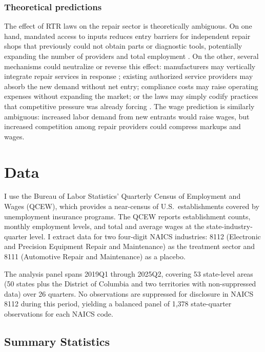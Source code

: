 \documentclass[12pt]{article}
\begin{document}
\subsubsection*{Theoretical predictions} The effect of RTR laws on the repair sector is theoretically ambiguous. On one hand, mandated access to inputs reduces entry barriers for independent repair shops that previously could not obtain parts or diagnostic tools, potentially expanding the number of providers and total employment \citep{kleiner2006licensing}. On the other, several mechanisms could neutralize or reverse this effect: manufacturers may vertically integrate repair services in response \citep{tirole1988theory}; existing authorized service providers may absorb the new demand without net entry; compliance costs may raise operating expenses without expanding the market; or the laws may simply codify practices that competitive pressure was already forcing \citep{perzanowski2022right}. The wage prediction is similarly ambiguous: increased labor demand from new entrants would raise wages, but increased competition among repair providers could compress markups and wages.

\section{Data}

I use the Bureau of Labor Statistics' Quarterly Census of Employment and Wages (QCEW), which provides a near-census of U.S.\ establishments covered by unemployment insurance programs. The QCEW reports establishment counts, monthly employment levels, and total and average wages at the state-industry-quarter level. I extract data for two four-digit NAICS industries: 8112 (Electronic and Precision Equipment Repair and Maintenance) as the treatment sector and 8111 (Automotive Repair and Maintenance) as a placebo.

The analysis panel spans 2019Q1 through 2025Q2, covering 53 state-level areas (50 states plus the District of Columbia and two territories with non-suppressed data) over 26 quarters. No observations are suppressed for disclosure in NAICS 8112 during this period, yielding a balanced panel of 1,378 state-quarter observations for each NAICS code.

\subsection{Summary Statistics}


\end{document}
